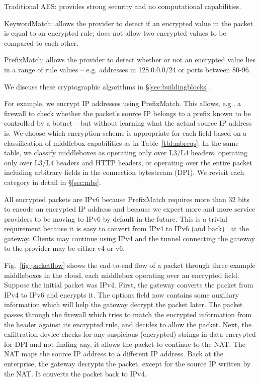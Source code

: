 \begin{myitemize}
\item Traditional AES: provides strong security and no computational capabilities.
\item KeywordMatch:  allows the provider to detect if an encrypted value in the packet is equal to an encrypted rule; does not allow two encrypted values to be compared to each other.
\item PrefixMatch: allows the provider to detect whether or not an encrypted value lies in a range of rule values -- e.g. addresses in 128.0.0.0/24 or ports between 80-96.
\end{myitemize}
We discuss these cryptographic algorithms in \S\ref{sec:buildingblocks}.

For example, we encrypt IP addresses using PrefixMatch. This allows, e.g., a firewall to check whether the packet's source IP belongs to a prefix known to be controlled by a botnet -- but without learning what the actual source IP address is.
We choose which encryption scheme is appropriate for each field based on a  classification of middlebox capabilities as in Table~\ref{tbl:mbreqs}. In the same table,
we classify middleboxes as operating only over L3/L4 headers, operating only over L3/L4 headers and HTTP headers, or operating over the entire packet including arbitrary fields in the connection bytestream (DPI).
We revisit each category in detail in \S\ref{sec:mbs}.

All encrypted packets are IPv6  because PrefixMatch  requires more than 32 bits to encode an encrypted IP address  and because we expect more and more service providers to be moving to IPv6 by default in the future.
This is a trivial requirement because it is easy to convert from IPv4 to IPv6 (and back)~\cite{siit} at the gateway.  Clients may continue using IPv4 and the tunnel connecting the gateway to the provider may be either v4 or v6.



 Fig.~\ref{fig:packetflow} shows the end-to-end flow of a packet through three example middleboxes in the cloud, each middlebox operating over an encrypted field.  
Suppose the initial packet was IPv4. First,  the gateway converts the packet from IPv4 to IPv6 and encrypts it.  The options field now contains some auxiliary information which will help the gateway decrypt the packet later. The packet passes through the firewall which tries to match the encrypted information from the header against its encrypted rule, and decides to allow the packet. Next, the exfiltration device checks for any suspicious (encrypted) strings in data encrypted for DPI and not finding any, it allows the packet to continue to the NAT. The NAT maps the source IP address to a different IP address. Back at the enterprise, the gateway decrypts the packet, except for the source IP written by the NAT. It converts the packet back to IPv4.



